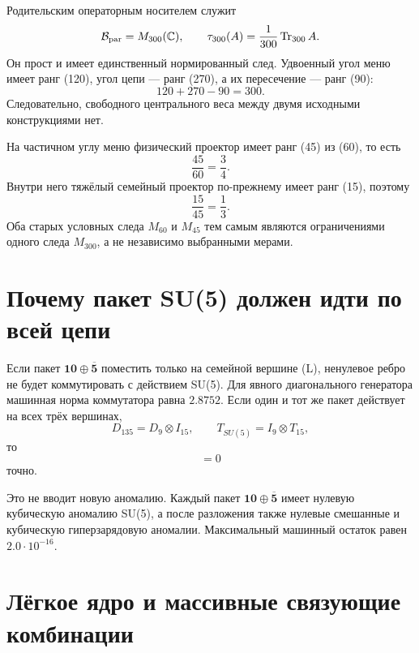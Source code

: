 Родительским операторным носителем служит
\begin{equation}
 \mathcal B_{\mathrm{par}}=M_{300}(\mathbb C),
 \qquad
 \tau_{300}(A)=\frac1{300}\operatorname{Tr}_{300}A.
\end{equation}
Он прост и имеет единственный нормированный след. Удвоенный угол меню имеет
ранг (120), угол цепи --- ранг (270), а их пересечение --- ранг (90):
\begin{equation}
 120+270-90=300.
\end{equation}
Следовательно, свободного центрального веса между двумя исходными
конструкциями нет.

На частичном углу меню физический проектор имеет ранг (45) из (60),
то есть
\begin{equation}
 \frac{45}{60}=\frac34.
\end{equation}
Внутри него тяжёлый семейный проектор по-прежнему имеет ранг (15), поэтому
\begin{equation}
 \frac{15}{45}=\frac13.
\end{equation}
Оба старых условных следа \(M_{60}\) и \(M_{45}\) тем самым являются
ограничениями одного следа \(M_{300}\), а не независимо выбранными мерами.

\section{Почему пакет SU(5) должен идти по всей цепи}

Если пакет \(\mathbf{10}\oplus\overline{\mathbf5}\) поместить только на
семейной вершине (L), ненулевое ребро не будет коммутировать с действием
SU(5). Для явного диагонального генератора машинная норма коммутатора равна
\(2.8752\). Если один и тот же пакет действует на всех трёх вершинах,
\begin{equation}
 D_{135}=D_9\otimes I_{15},
 \qquad
 T_{SU(5)}=I_9\otimes T_{15},
\end{equation}
то
\begin{equation}
 [D_{135},T_{SU(5)}]=0
\end{equation}
точно.

Это не вводит новую аномалию. Каждый пакет
\(\mathbf{10}\oplus\overline{\mathbf5}\) имеет нулевую кубическую аномалию
SU(5), а после разложения также нулевые смешанные и кубическую
гиперзарядовую аномалии. Максимальный машинный остаток равен
\(2.0\cdot10^{-16}\).

\section{Лёгкое ядро и массивные связующие комбинации}

